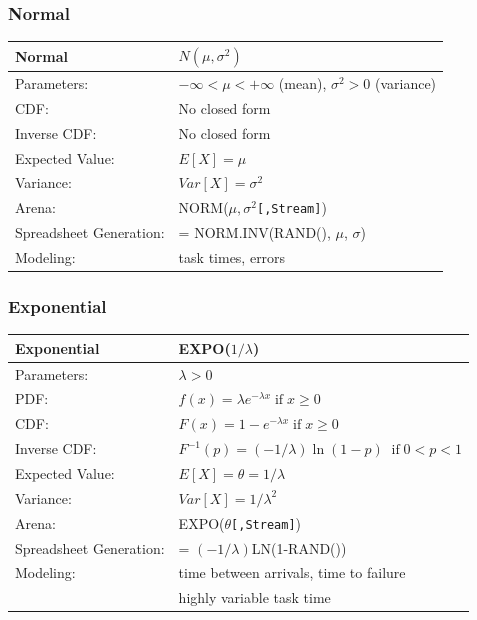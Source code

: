 \documentclass[
]{book}
\theoremstyle{definition}
\theoremstyle{definition}
\theoremstyle{definition}
\theoremstyle{definition}
\theoremstyle{remark}
\begin{document}
\hypertarget{normal}{%
\subsubsection*{Normal}\label{normal}}


\begin{longtable}[]{@{}ll@{}}
\toprule
\textbf{Normal} & \(N(\mu,\sigma^2)\) \\
\midrule
\endhead
Parameters: & \(-\infty < \mu < +\infty\) (mean), \(\sigma^2 > 0\) (variance) \\
CDF: & No closed form \\
Inverse CDF: & No closed form \\
Expected Value: & \(E[X] = \mu\) \\
Variance: & \(Var[X] = \sigma^2\) \\
Arena: & NORM(\(\mu,\sigma^2\)\texttt{{[},Stream{]}}) \\
Spreadsheet Generation: & = NORM.INV(RAND(), \(\mu\), \(\sigma\)) \\
Modeling: & task times, errors \\
\bottomrule
\end{longtable}

\hypertarget{exponential}{%
\subsubsection*{Exponential}\label{exponential}}


\begin{longtable}[]{@{}ll@{}}
\toprule
\textbf{Exponential} & EXPO(\(1/\lambda\)) \\
\midrule
\endhead
Parameters: & \(\lambda > 0\) \\
PDF: & \(f(x) = \lambda e^{-\lambda x} \; \text{if} \; x \geq 0\) \\
CDF: & \(F(x) = 1 - e^{-\lambda x} \; \text{if} \; x \geq 0\) \\
Inverse CDF: & \(F^{-1}(p) = (-1/\lambda)\ln \left(1-p \right) \; \; \text{if} \; 0 < p < 1\) \\
Expected Value: & \(E[X] = \theta = 1/\lambda\) \\
Variance: & \(Var[X] = 1/\lambda^2\) \\
Arena: & EXPO(\(\theta\)\texttt{{[},Stream{]}}) \\
Spreadsheet Generation: & = \((-1/\lambda)\)LN(1-RAND()) \\
Modeling: & time between arrivals, time to failure \\
& highly variable task time \\
\bottomrule
\end{longtable}
\end{document}
